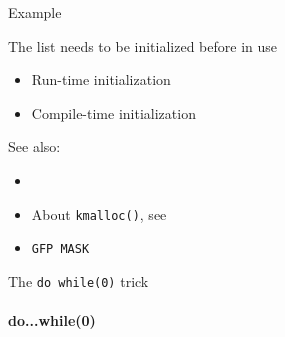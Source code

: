\begin{frame}{Example}
  \begin{center}
  \end{center}
  \begin{block}{The list needs to be initialized before in use}
    \begin{itemize}
    \item Run-time initialization
      \begin{center}
      \end{center}
    \item Compile-time initialization
      \begin{center}
      \end{center}
    \end{itemize}
  \end{block}
\end{frame}

See also:
\begin{itemize}
\item {}
\item About \texttt{kmalloc()}, see 
\item \texttt{GFP MASK} 
\end{itemize}

\begin{frame}
  \begin{block}{The \texttt{do while(0)} trick}
    \begin{center}
    \end{center}
  \end{block}
\end{frame}

\paragraph{do...while(0)}

